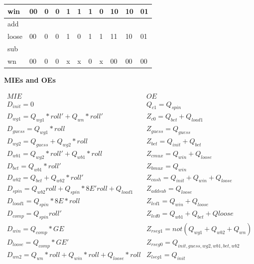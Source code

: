 \begin{enumerate}
\begin{solution}
{{\begin{tabular}{l|l|l|l|l|l|l|l|l|l|l}
win   & 00      & 0      &  0     & 1	      & 1        &  1     &  0     & 10       &  10     & 01\\ \hline
add    &         &        &        &  	      &          &        &        &          &         &   \\ \hline
loose & 00      & 0      &  0     & 1	      & 0        &  1     &  1     & 11       &  10     & 01\\ \hline
sub   &         &        &        &  	      &          &        &        &          &         &   \\ \hline
wn    & 00      & 0      &  0     & x	      & x        &  0     &  x     & 00       &  00     & 00\\ 
\end{tabular}
}

{\bf MIEs and OEs}

$$
\begin{array}{ll}
MIE						&       OE                      \\
D_{init}= 0					&  Q_{c1} = Q_{spin}          \\
D_{wg1}= Q_{wg1}*roll'+Q_{wn}*roll'		&  Z_{c0} = Q_{bet} + Q_{load1}           \\
D_{guess} = Q_{wg1}*roll           		&  Z_{guess} = Q_{guess}           \\
D_{wg2}= Q_{guess} + Q_{wg2}*roll		&  Z_{bet}= Q_{init} + Q_{bet} \\
D_{wb1}= Q_{wg2}*roll'+Q_{wb1}*roll		&  Z_{cmux} = Q_{win}+Q_{loose}           \\
D_{bet } = Q_{wb1}*roll'			&  Z_{bmux} = Q_{win}           \\
D_{wb2}= Q_{bet} + Q_{wb2}*roll'		&  Z_{cash} = Q_{init} + Q_{win} + Q_{loose}    \\
D_{spin}= Q_{wb2}roll + Q_{spin}*8E'roll + Q_{load1}  &  Z_{addsub} = Q_{loose}     \\
D_{load1}= Q_{spin}*8E*roll    		& Z_{led1} = Q_{win} + Q_{loose} \\
D_{comp} = Q_{spin}roll'			& Z_{led0} = Q_{wb1}+Q_{bet}+Q{loose}         \\
D_{win}= Q_{comp}*GE				& Z_{rseg1} = not (Q_{wg1}+Q_{wb2}+Q_{wn})      \\
D_{loose} = Q_{comp}*GE'			& Z_{rseg0} = Q_{init,guess,wg2,wb1,bet,wb2}\\
D_{wn2} = Q_{wn}*roll + Q_{win}*roll + Q_{loose}*roll & Z_{lseg1} = Q_{init}  \\
\end{array} $$

}
\end{solution}
\end{enumerate}
